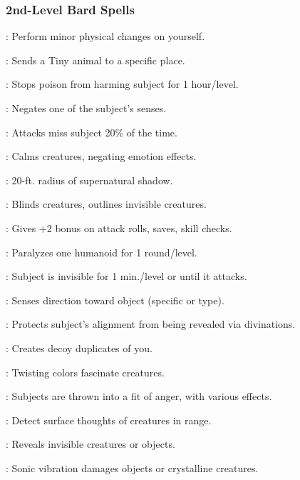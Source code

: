 \subsubsection{2nd-Level Bard Spells}
\begin{list}{}{\leftmargin=1em}
\item {}: Perform minor physical changes on yourself.
\item {}: Sends a Tiny animal to a specific place.
\item {}: Stops poison from harming subject for 1 hour/level.
\item {}: Negates one of the subject's senses.
\item {}: Attacks miss subject 20\% of the time.
\item {}: Calms creatures, negating emotion effects.
\item {}: 20-ft. radius of supernatural shadow.
\item {}: Blinds creatures, outlines invisible creatures.
\item {}: Gives +2 bonus on attack rolls, saves, skill checks.
\item {}: Paralyzes one humanoid for 1 round/level.
\item {}: Subject is invisible for 1 min./level or until it attacks.
\item {}: Senses direction toward object (specific or type).
\item {}: Protects subject's alignment from being revealed via divinations.
\item {}: Creates decoy duplicates of you.
\item {}: Twisting colors fascinate creatures.
\item {}: Subjects are thrown into a fit of anger, with various effects.
\item {}: Detect surface thoughts of creatures in range.
\item {}: Reveals invisible creatures or objects.
\item {}: Sonic vibration damages objects or crystalline creatures.

\end{list}
